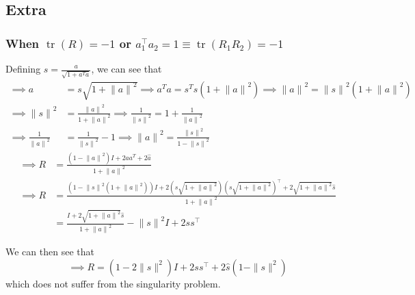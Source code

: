 \subsection*{Extra}

\subsubsection*{When \( \operatorname{tr}(R) = -1 \) or \( a_1^\top a_2 = 1 \equiv \operatorname{tr}(R_1 R_2) = -1 \)}

Defining \( s=\frac{a}{\sqrt{1+a^{T} a}} \), we can see that
\begin{align*}
    \implies
    a
     & =
    s \sqrt{1 + {\| a \|}^2}
    \implies
    a^{T} a
    =
    s^{T} s \left( 1 + {\| a \|}^2 \right)
    \implies
    {\| a \|}^2
    =
    {\| s \|}^2 \left( 1 + {\| a \|}^2 \right)
    \\
    \implies
    {\| s \|}^2
     & =
    \frac{{\| a \|}^2}{1 + {\| a \|}^2}
    \implies
    \frac{1}{{\| s \|}^2}
    =
    1 + \frac{1}{{\| a \|}^2}
    \\
    \implies
    \frac{1}{{\| a \|}^2}
     & =
    \frac{1}{{\| s \|}^2} - 1
    \implies
    {\| a \|}^2
    =
    \frac{{\| s \|}^2}{1 - {\| s \|}^2}
\end{align*}
\begin{align*}
    \implies
    R
     & =
    \frac{\left( 1 - {\| a \|}^2 \right) I + 2 a a^{T} + 2 \widehat{a}}{1 + {\| a \|}^2}
    \\
    \implies
    R
     & =
    \frac{
    \left( 1 - {\| s \|}^2 \left( 1 + {\| a \|}^2 \right) \right) I
    + 2 \left( s \sqrt{1 + {\| a \|}^2} \right) {\left( s \sqrt{1 + {\| a \|}^2} \right)}^{\top}
    + 2 \sqrt{1 + {\| a \|}^2} \widehat{s}
    }
    {1 + {\| a \|}^2}
    \\ & =
    \frac{
    I
    + 2 \sqrt{1 + {\| a \|}^2} \widehat{s}
    }
    {1 + {\| a \|}^2}
    - {\| s \|}^2 I
    + 2 s s^{\top}
\end{align*}

We can then see that
\begin{equation*}
    \implies
    R
    =
    \left(1 - 2\|s\|^2\right) I + 2 ss^{\top} + 2\widehat{s}(1 - \|s\|^2)
\end{equation*}
which does not suffer from the singularity problem.

